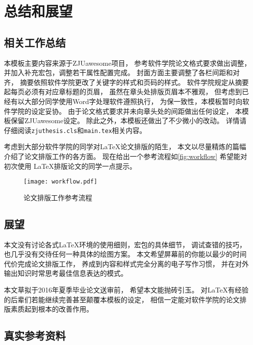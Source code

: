 
\chapter{总结和展望}

\section{相关工作总结}

本模板主要内容来源于ZJUawesome项目，
参考软件学院论文格式要求做出调整，
并加入补充宏包，调整若干属性配置完成。
封面方面主要调整了各栏间距和对齐，
摘要依照软件学院更改了关键字的样式和页码的样式。
软件学院规定从摘要起每页必须有对应章标题的页眉，
虽然在章头处排版页眉本不雅观，
但考虑到已经有以大部分同学使用Word字处理软件遵照执行，
为保一致性，本模板暂时向软件学院的设定妥协。
由于论文格式要求并未向章头处的间距做出任何设定，
本模板保留ZJUawesome设定。
除此之外，本模板还做出了不少微小的改动。
详情请仔细阅读\texttt{zjuthesis.cls}和\texttt{main.tex}相关内容。

考虑到大部分软件学院的同学对\LaTeX 论文排版的陌生，
本文以尽量精炼的篇幅介绍了论文排版工作的各方面。
现在给出一个参考流程如\autoref{fig:workflow} 希望能对初次使用
\LaTeX 排版论文的同学一点提示。

\begin{figure}[htbp]
    \centering
    \texttt{[image: workflow.pdf]}
    \caption{论文排版工作参考流程}
    \label{fig:workflow}
\end{figure}

\section{展望}

本文没有讨论各式\LaTeX 环境的使用细则，宏包的具体细节，
调试查错的技巧，也几乎没有交待任何一种具体的绘图方案。
本文希望屏幕前的你能以最少的时间代价完成论文排版工作，
养成到内容和样式完全分离的电子写作习惯，
并在对外输出知识时常思考最佳信息表达的模式。

本文草拟于2016年夏季毕业论文送审前，
希望本文能抛砖引玉。
对\LaTeX 有经验的后辈们若能继续完善甚至颠覆本模板的设定，
相信一定能对软件学院的论文排版素质起到根本的改善作用。

\section{真实参考资料}

